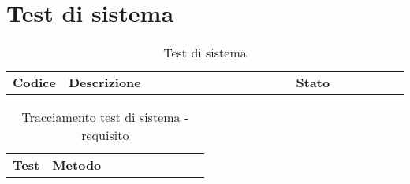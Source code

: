 \documentclass[PianoDiQualifica.tex]{subfiles}
\begin{document}
\chapter{Test di sistema}

\begin{table}[H]
	\begin{center}
		\begin{tabu} to 
			\tableHeaderStyle			
			\textbf{Codice} & \textbf{Descrizione} & \textbf{Stato} \\
			
		\end{tabu}
		\caption{Test di sistema}
		\vspace{-1em}
	\end{center}
\end{table}	

\begin{table}[H]
	\begin{center}
		\begin{tabu} to 
			\tableHeaderStyle			
			\textbf{Test} & \textbf{Metodo} \\
			
		\end{tabu}
		\caption{Tracciamento test di sistema - requisito}
		\vspace{-1em}
	\end{center}
\end{table}	
\end{document}

